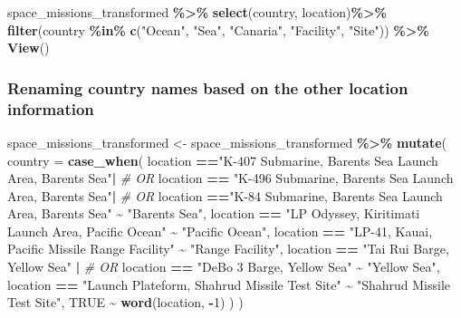 \documentclass[
]{article}
\newenvironment{Shaded}{\begin{snugshade}}{\end{snugshade}}
\newcommand{\AttributeTok}[1]{\textcolor[rgb]{0.13,0.29,0.53}{#1}}
\newcommand{\CommentTok}[1]{\textcolor[rgb]{0.56,0.35,0.01}{\textit{#1}}}
\newcommand{\ConstantTok}[1]{\textcolor[rgb]{0.56,0.35,0.01}{#1}}
\newcommand{\DecValTok}[1]{\textcolor[rgb]{0.00,0.00,0.81}{#1}}
\newcommand{\FunctionTok}[1]{\textcolor[rgb]{0.13,0.29,0.53}{\textbf{#1}}}
\newcommand{\NormalTok}[1]{#1}
\newcommand{\OtherTok}[1]{\textcolor[rgb]{0.56,0.35,0.01}{#1}}
\newcommand{\SpecialCharTok}[1]{\textcolor[rgb]{0.81,0.36,0.00}{\textbf{#1}}}
\newcommand{\StringTok}[1]{\textcolor[rgb]{0.31,0.60,0.02}{#1}}
\begin{document}
\begin{Shaded}
\begin{Highlighting}[]
\NormalTok{space\_missions\_transformed }\SpecialCharTok{\%\textgreater{}\%}
  \FunctionTok{select}\NormalTok{(country, location)}\SpecialCharTok{\%\textgreater{}\%}
  \FunctionTok{filter}\NormalTok{(country }\SpecialCharTok{\%in\%} \FunctionTok{c}\NormalTok{(}\StringTok{"Ocean"}\NormalTok{, }\StringTok{"Sea"}\NormalTok{, }\StringTok{"Canaria"}\NormalTok{, }\StringTok{"Facility"}\NormalTok{, }\StringTok{"Site"}\NormalTok{)) }\SpecialCharTok{\%\textgreater{}\%} 
  \FunctionTok{View}\NormalTok{()}
\end{Highlighting}
\end{Shaded}

\hypertarget{renaming-country-names-based-on-the-other-location-information}{%
\subsubsection{Renaming country names based on the other location
information}\label{renaming-country-names-based-on-the-other-location-information}}

\begin{Shaded}
\begin{Highlighting}[]
\NormalTok{space\_missions\_transformed }\OtherTok{\textless{}{-}}
\NormalTok{  space\_missions\_transformed }\SpecialCharTok{\%\textgreater{}\%} \FunctionTok{mutate}\NormalTok{(}
    \AttributeTok{country =} \FunctionTok{case\_when}\NormalTok{(}
\NormalTok{      location }\SpecialCharTok{==}\StringTok{"K{-}407 Submarine, Barents Sea Launch Area, Barents Sea"}\SpecialCharTok{|}
        \CommentTok{\# OR}
\NormalTok{        location }\SpecialCharTok{==} \StringTok{"K{-}496 Submarine, Barents Sea Launch Area, Barents Sea"}\SpecialCharTok{|}
        \CommentTok{\# OR}
\NormalTok{        location }\SpecialCharTok{==}\StringTok{"K{-}84 Submarine, Barents Sea Launch Area, Barents Sea"} \SpecialCharTok{\textasciitilde{}} \StringTok{"Barents Sea"}\NormalTok{,}
\NormalTok{      location }\SpecialCharTok{==} \StringTok{"LP Odyssey, Kiritimati Launch Area, Pacific Ocean"} \SpecialCharTok{\textasciitilde{}} \StringTok{"Pacific Ocean"}\NormalTok{,}
\NormalTok{      location }\SpecialCharTok{==} \StringTok{"LP{-}41, Kauai, Pacific Missile Range Facility"} \SpecialCharTok{\textasciitilde{}} \StringTok{"Range Facility"}\NormalTok{,}
\NormalTok{      location }\SpecialCharTok{==} \StringTok{"Tai Rui Barge, Yellow Sea"} \SpecialCharTok{|}
        \CommentTok{\# OR}
\NormalTok{      location }\SpecialCharTok{==} \StringTok{"DeBo 3 Barge, Yellow Sea"} \SpecialCharTok{\textasciitilde{}} \StringTok{"Yellow Sea"}\NormalTok{,}
\NormalTok{      location }\SpecialCharTok{==} \StringTok{"Launch Plateform, Shahrud Missile Test Site"} \SpecialCharTok{\textasciitilde{}} \StringTok{"Shahrud Missile Test Site"}\NormalTok{,}
      \ConstantTok{TRUE} \SpecialCharTok{\textasciitilde{}} \FunctionTok{word}\NormalTok{(location, }\SpecialCharTok{{-}}\DecValTok{1}\NormalTok{)}
\NormalTok{    )}
\NormalTok{  )}
\end{Highlighting}
\end{Shaded}
\end{document}
